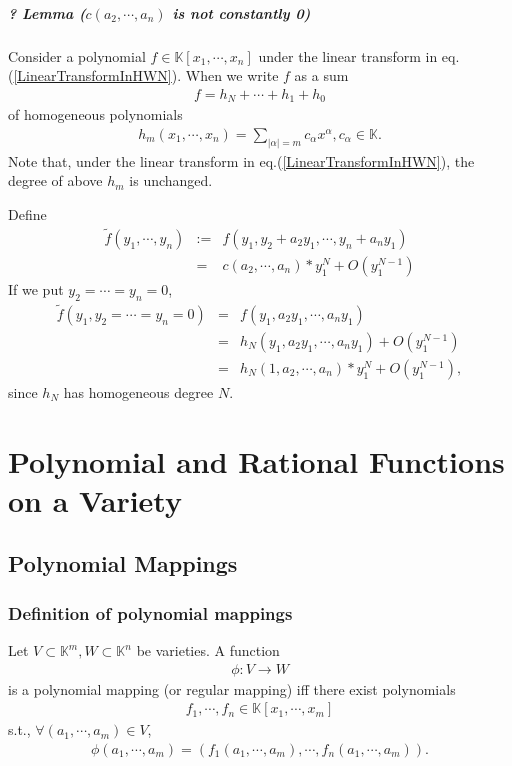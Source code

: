 \documentclass[11pt]{book}
\begin{document}
\paragraph{? Lemma ($c(a_2, \cdots, a_n)$ is not constantly 0)}
Consider a polynomial $f \in \mathbb{K}[x_1, \cdots, x_n]$ under the linear transform in eq.(\ref{LinearTransformInHWN}).
When we write $f$ as a sum
\begin{eqnarray}
f = h_N + \cdots + h_1 + h_0
\end{eqnarray}
of homogeneous polynomials
\begin{eqnarray}
h_m(x_1, \cdots, x_n) = \sum_{|\alpha| = m} c_\alpha x^\alpha, c_\alpha \in \mathbb{K}.
\end{eqnarray}
Note that, under the linear transform in eq.(\ref{LinearTransformInHWN}), the degree of above $h_m$ is unchanged.

Define
\begin{eqnarray}
\tilde{f}(y_1, \cdots, y_n) &:=& f(y_1, y_2 + a_2y_1, \cdots, y_n + a_n y_1)\\
&=& c(a_2, \cdots, a_n) * y_1^N + O(y_1^{N-1})
\end{eqnarray}
If we put $y_2 = \cdots = y_n = 0$,
\begin{eqnarray}
\tilde{f}(y_1, y_2 = \cdots = y_n = 0) &=& f(y_1, a_2y_1, \cdots, a_n y_1) \\
&=& h_N(y_1, a_2y_1, \cdots, a_n y_1) + O(y_1^{N-1}) \\
&=& h_N(1, a_2, \cdots, a_n) * y_1^N + O(y_1^{N-1}),
\end{eqnarray}
since $h_N$ has homogeneous degree $N$.














\chapter{Polynomial and Rational Functions on a Variety}
\section{Polynomial Mappings}
\subsection{Definition of polynomial mappings}
\label{polynomialMappings}
Let $V \subset \mathbb{K}^m, W \subset \mathbb{K}^n$ be varieties.
A function
\begin{eqnarray}
\phi: V \to W
\end{eqnarray}
is a polynomial mapping (or regular mapping) iff there exist polynomials
\begin{eqnarray}
f_1, \cdots, f_n \in \mathbb{K}[x_1, \cdots, x_m]
\end{eqnarray}
s.t., $\forall (a_1, \cdots, a_m) \in V$,
\begin{eqnarray}
\phi(a_1, \cdots, a_m) = \left( f_1(a_1, \cdots, a_m), \cdots, f_n(a_1, \cdots, a_m) \right).
\end{eqnarray}
\end{document}
